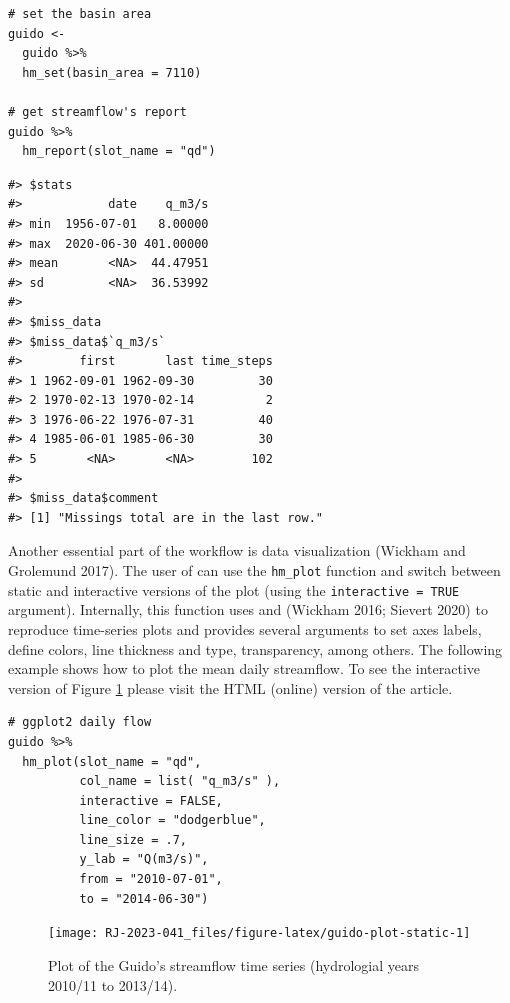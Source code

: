 \begin{verbatim}
# set the basin area
guido <- 
  guido %>% 
  hm_set(basin_area = 7110)

# get streamflow's report
guido %>% 
  hm_report(slot_name = "qd")
\end{verbatim}

\begin{verbatim}
#> $stats
#>            date    q_m3/s
#> min  1956-07-01   8.00000
#> max  2020-06-30 401.00000
#> mean       <NA>  44.47951
#> sd         <NA>  36.53992
#> 
#> $miss_data
#> $miss_data$`q_m3/s`
#>        first       last time_steps
#> 1 1962-09-01 1962-09-30         30
#> 2 1970-02-13 1970-02-14          2
#> 3 1976-06-22 1976-07-31         40
#> 4 1985-06-01 1985-06-30         30
#> 5       <NA>       <NA>        102
#> 
#> $miss_data$comment
#> [1] "Missings total are in the last row."
\end{verbatim}

Another essential part of the workflow is data visualization
(Wickham and Grolemund 2017). The user of  can use the \texttt{hm\_plot}
function and switch between static and interactive versions of the plot
(using the \texttt{interactive\ =\ TRUE} argument). Internally, this function
uses  and  (Wickham 2016; Sievert 2020)
to reproduce time-series plots and provides several arguments to set
axes labels, define colors, line thickness
and type, transparency, among others. The following
example shows how to plot the mean daily streamflow. To see the interactive version
of Figure \ref{fig:guido-plot-static}
please visit the HTML (online) version of the article.

\begin{verbatim}
# ggplot2 daily flow
guido %>% 
  hm_plot(slot_name = "qd",
          col_name = list( "q_m3/s" ), 
          interactive = FALSE, 
          line_color = "dodgerblue",
          line_size = .7,
          y_lab = "Q(m3/s)", 
          from = "2010-07-01", 
          to = "2014-06-30") 
\end{verbatim}

\begin{figure}

{\centering \texttt{[image: RJ-2023-041\_files/figure-latex/guido-plot-static-1]} 

}

\caption{Plot of the Guido's streamflow time series (hydrologial years 2010/11 to 2013/14).}\label{fig:guido-plot-static}
\end{figure}


